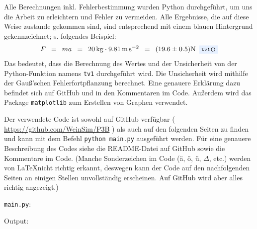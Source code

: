 \documentclass{article}
\newcommand{\widespace}{\enspace}
\newcommand{\wideeq}{\widespace = \widespace}
\newcommand{\coderef}[1]{%
    \text{\footnotesize \colorbox{codebg}{\texttt{#1()}}}%
}
\newcommand{\githuburl}{
    \url{https://github.com/WeinSim/P3B}
}
\begin{document}
Alle Berechnungen inkl. Fehlerbestimmung wurden Python durchgeführt, um uns die Arbeit
zu erleichtern und Fehler zu vermeiden.
Alle Ergebnisse, die auf diese Weise zustande gekommen sind,
sind entsprechend mit einem \colorbox{codebg}{blauen Hintergrund} gekennzeichnet;
s. folgendes Beispiel:
\[
    F \wideeq ma \wideeq \qty{20}{\kg} \cdot \qty{9.81}{\meter\per\square\second}
    \wideeq (\num{19.6} \pm \num{0,5}) \unit{\N} \widespace \coderef{tv1}
\]
Das bedeutet, dass die Berechnung des Wertes und der Unsicherheit von der
Python-Funktion namens \verb|tv1| durchgeführt wird.
Die Unsicherheit wird mithilfe der Gauß'schen Fehlerfortpflanzung berechnet.
Eine genauere Erklärung dazu befindet sich auf GitHub und in den Kommentaren im Code.
Außerdem wird das Package \texttt{matplotlib} zum Erstellen
von Graphen verwendet.

Der verwendete Code ist sowohl auf GitHub verfügbar (\githuburl) als auch auf den
folgenden Seiten zu finden und kann mit dem Befehl \texttt{python main.py}
ausgeführt werden. Für eine genauere Beschreibung des Codes siehe die README-Datei
auf GitHub sowie die Kommentare im Code.
(Manche Sonderzeichen im Code (ä, ö, ü, $\Delta$, etc.) werden von \LaTeX nicht
richtig erkannt, deswegen kann der Code auf den nachfolgenden Seiten an einigen
Stellen unvollständig erscheinen. Auf GitHub wird aber alles richtig angezeigt.)

\newpage


\verb|main.py|:

\newpage

% 

Output:

\end{document}
